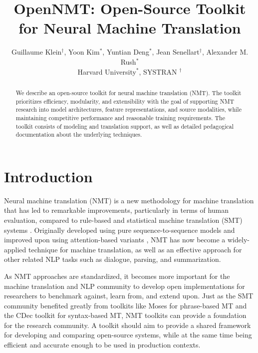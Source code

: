 \documentclass[11pt]{article}
\title{OpenNMT: Open-Source Toolkit for Neural Machine Translation}
\author{Guillaume Klein$^\dagger$, Yoon Kim$^*$, Yuntian Deng$^*$, Jean Senellart$^\dagger$, Alexander M. Rush$^*$ \\ Harvard University$^*$, SYSTRAN $^\dagger$}
\date{}
\begin{document}
\maketitle
\begin{abstract}

  We describe an open-source toolkit for neural machine translation
  (NMT).  The toolkit prioritizes efficiency, modularity, and
  extensibility with the goal of supporting NMT research into model
  architectures, feature representations, and source modalities, while
  maintaining competitive performance and reasonable training
  requirements. The toolkit consists of modeling and translation support,
  as well as detailed pedagogical documentation about the underlying
  techniques.

\end{abstract}

\section{Introduction}


Neural machine translation (NMT) is a new methodology for machine
translation that has led to remarkable improvements, particularly in
terms of human evaluation, compared to rule-based
and statistical machine translation (SMT) systems
\cite{wu2016google,systran}. Originally developed using pure
sequence-to-sequence models \cite{sutskever14sequence,Cho2014} and
improved upon using attention-based variants \cite{Bahdanau2015,Luong2015}, NMT has now become a widely-applied technique for machine
translation, as well as an effective approach for other related NLP
tasks such as dialogue, parsing, and summarization.

As NMT approaches are standardized, it becomes more important for the
machine translation and NLP community to develop open
implementations for researchers to benchmark against, learn from, and
extend upon. Just as the SMT community benefited greatly from toolkits
like Moses \cite{koehn2007moses} for phrase-based MT and the CDec
toolkit \cite{dyer2010cdec} for syntax-based MT, NMT toolkits can
provide a foundation for the research community. A toolkit should aim
to provide a shared framework for developing and comparing
open-source systems, while at the same time being
efficient and accurate enough to be used in production contexts.
\end{document}
